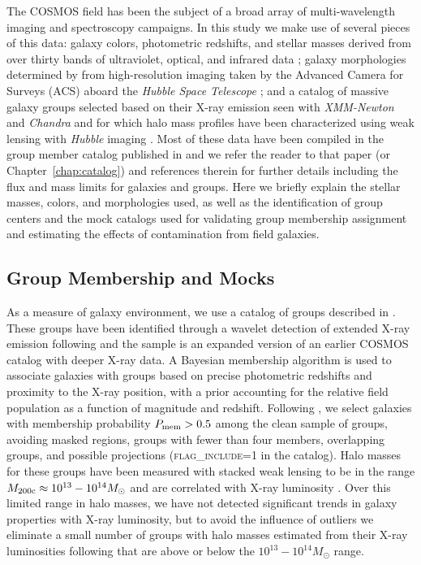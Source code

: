 The COSMOS field \citep{Scoville2007a} has been the subject of a broad
array of multi-wavelength imaging and spectroscopy campaigns. In this
study we make use of several pieces of this data: galaxy colors,
photometric redshifts, and stellar masses derived from over thirty
bands of ultraviolet, optical, and infrared data \citep{Ilbert2009,
  Ilbert2010, Bundy2010}; galaxy morphologies determined by
\citet{Scarlata2007} from high-resolution imaging taken by the
Advanced Camera for Surveys (ACS) aboard the \textit{Hubble Space
  Telescope} \citep{Koekemoer2007}; and a catalog of massive galaxy
groups selected based on their X-ray emission seen with
\textit{XMM-Newton} and \textit{Chandra} and for which halo mass
profiles have been characterized using weak lensing with
\textit{Hubble} imaging \citep{Leauthaud2010, George2011,
  George2012}. Most of these data have been compiled in the group
member catalog published in \citet{George2011} and we refer the reader
to that paper (or Chapter~\ref{chap:catalog}) and references therein
for further details including the flux and mass limits for galaxies
and groups. Here we briefly explain the stellar masses, colors, and
morphologies used, as well as the identification of
group centers and the mock catalogs used for validating group
membership assignment and estimating the effects of contamination from
field galaxies.

\subsection{Group Membership and Mocks}
\label{tran_s:groupdata}

As a measure of galaxy environment, we use a catalog of groups
described in \citet{George2011}. These groups have been identified
through a wavelet detection of extended X-ray emission following
\citet{Finoguenov2010} and the sample is an expanded version of an
earlier COSMOS catalog \citep{Finoguenov2007} with deeper X-ray data.
A Bayesian membership algorithm is used to associate galaxies with
groups based on precise photometric redshifts and proximity to the
X-ray position, with a prior accounting for the relative field
population as a function of magnitude and redshift. Following
\citet{George2011}, we select galaxies with membership probability
$P_{\rm mem}>0.5$ among the clean sample of groups, avoiding masked
regions, groups with fewer than four members, overlapping groups, and
possible projections (\textsc{flag\_include}=1 in the catalog). Halo
masses for these groups have been measured with stacked weak lensing
to be in the range $M_{\rm 200c} \approx 10^{13} - 10^{14} M_{\odot}$
and are correlated with X-ray luminosity \citep{Leauthaud2010,
  George2012}. Over this limited range in halo masses, we have not
detected significant trends in galaxy properties with X-ray
luminosity, but to avoid the influence of outliers we eliminate a
small number of groups with halo masses estimated from
  their X-ray luminosities following \citet{Leauthaud2010} that are
above or below the $10^{13}-10^{14} M_{\odot}$ range.

